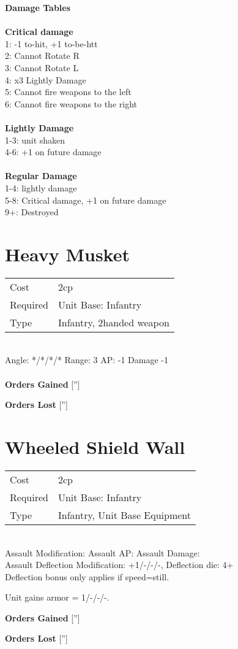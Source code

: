 {\bf Damage Tables} \\
\ \\ {\bf Critical damage } \\
1: -1 to-hit, +1 to-be-htt \\
2: Cannot Rotate R \\
3: Cannot Rotate L \\
4: x3 Lightly Damage \\
5: Cannot fire weapons to the left \\
6: Cannot fire weapons to the right \\
\ \\ {\bf Lightly Damage } \\
1-3: unit shaken \\
4-6: +1 on future damage \\
\ \\ {\bf Regular Damage } \\
1-4: lightly damage \\
5-8: Critical damage, +1 on future damage \\
9+: Destroyed \\









\pagebreak\section{ Heavy Musket }

\begin{tabular}{ll}
    Cost & 2cp \\
    Required & Unit Base: Infantry\\
    Type & Infantry, 2handed weapon\\
\end{tabular}
\ \\
\indent Angle: */*/*/* Range: 3  AP: -1 Damage -1 \\

\ \\

{\bf Orders Gained}
['']

{\bf Orders Lost}
['']
\section{ Wheeled Shield Wall }

\begin{tabular}{ll}
    Cost & 2cp \\
    Required & Unit Base: Infantry\\
    Type & Infantry, Unit Base Equipment\\
\end{tabular}
\ \\
Assault Modification:  Assault AP:  Assault Damage: \\
Assault Deflection Modification: +1/-/-/-, Deflection die: 4+ \\
Deflection bonus only applies if speed=still.

Unit gains armor = 1/-/-/-. 

{\bf Orders Gained}
['']

{\bf Orders Lost}
['']
